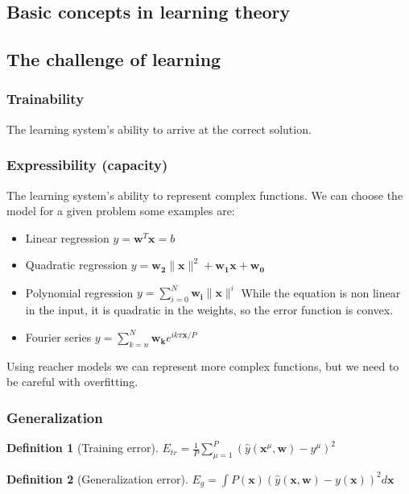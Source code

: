 \documentclass[11pt]{book} %
\newtheorem{definition}{Definition}[section]
\begin{document}
%
%
%

\subsection{Basic concepts in learning theory}

%
%
%

\subsection{The challenge of learning}
\subsubsection{Trainability}
The learning system's ability to arrive at the correct solution.

\subsubsection{Expressibility (capacity)}
The learning system's ability to represent complex functions.
We can choose the model for a given problem some examples are:
\begin{itemize}
    \item Linear regression $y = \mathbf{w}^T \mathbf{x} = b$
    \item Quadratic regression $y = \mathbf{w_2} \lVert \mathbf{x} \rVert^2 + \mathbf{w_1} \mathbf{x} + \mathbf{w_0}$
    \item Polynomial regression $y = \sum_{i=0}^{N} \mathbf{w_i} \lVert \mathbf{x} \rVert^i$
            While the equation is non linear in the input, it is quadratic in the weights, so the error function is convex.

    \item Fourier series $y = \sum_{k=n}^{N} \mathbf{w_k} e^{i k \pi \mathbf{x} / P}$ 
\end{itemize}
Using reacher models we can represent more complex functions, but we need to be careful with overfitting.

\subsubsection{Generalization}

\begin{definition}[Training error]
$E_{tr} = \frac{1}{P} \sum_{\mu=1}^{P} (\hat{y}(\mathbf{x}^\mu, \mathbf{w}) - y^\mu)^2$
\end{definition}

\begin{definition}[Generalization error]
$E_{g} = \int P(\mathbf{x}) (\hat{y}(\mathbf{x}, \mathbf{w}) - y(\mathbf{x}))^2 d\mathbf{x}$
\end{definition}
\end{document}
